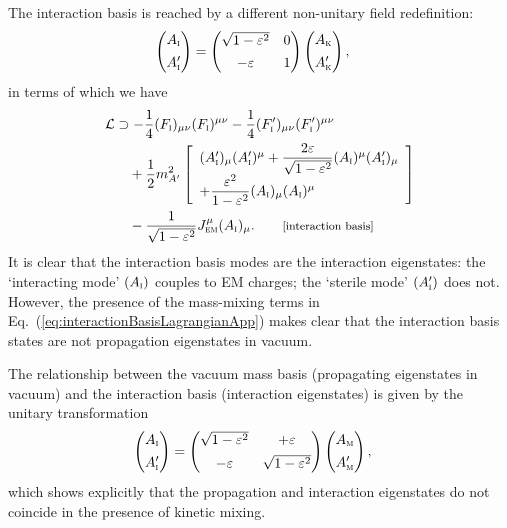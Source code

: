\documentclass[amsmath,amssymb,aps,10pt,prd,letterpaper,nofootinbib,balancelastpage,notitlepage,superscriptaddress,twocolumn,floatfix]{revtex4-2}
\renewcommand{\eqref}[2][]{Eq{#1}.~(\ref{eq:#2})}	%
\newcommand{\lb}{\ensuremath{\left}}					%
\newcommand{\rb}{\ensuremath{\right}}					%
\newcommand{\nl}{\nonumber \\ & \quad }					%
\newcommand{\LL}{\mathcal{L}}
\newcommand{\inter}[1]{({#1}_{\textsc{i}})}
\newcommand{\primeinter}[1]{({#1}_{\textsc{i}}^\prime)}
\begin{document}
The interaction basis is reached by a different non-unitary field redefinition:
\begin{align}
    \begin{pmatrix}
    A_{\textsc{i}} \\[1ex]
    A_{\textsc{i}}'  
    \end{pmatrix}
    &= \begin{pmatrix}
        \sqrt{1-\varepsilon^2} & 0 \\[1ex]
    -\varepsilon & 1 
    \end{pmatrix}
    \begin{pmatrix}
   A_{\textsc{k}} \\[1ex]
   A_{\textsc{k}}'
    \end{pmatrix},
    \label{eq:kineticTOinteraction}
\end{align}
in terms of which we have
\begin{align}
    \LL &\supset - \frac{1}{4} \inter{F}_{\mu\nu}\inter{F}^{\mu\nu} - \frac{1}{4} \primeinter{F}_{\mu\nu} \primeinter{F}^{\mu\nu} \nl
    + \frac{1}{2} m_{A'}^2 \lb[\begin{array}{l}
            \primeinter{A}_\mu \primeinter{A}^{\mu} + \dfrac{2\varepsilon}{\sqrt{1-\varepsilon^2}} \inter{A}^\mu \primeinter{A}_\mu \\[1ex]
            + \dfrac{\varepsilon^2}{1-\varepsilon^2} \inter{A}_\mu \inter{A}^\mu
            \end{array} \rb] \nl
    - \dfrac{1}{\sqrt{1-\varepsilon^2}} J_{\textsc{em}}^\mu \inter{A}_\mu.  \qquad \text{\footnotesize[interaction basis]}
    \label{eq:interactionBasisLagrangianApp}
\end{align}
It is clear that the interaction basis modes are the interaction eigenstates: the `interacting mode' $\inter{A}$ couples to EM charges; the `sterile mode' $\primeinter{A}$ does not.
However, the presence of the mass-mixing terms in \eqref{interactionBasisLagrangianApp} makes clear that the interaction basis states are not propagation eigenstates in vacuum.

The relationship between the vacuum mass basis (propagating eigenstates in vacuum) and the interaction basis (interaction eigenstates) is given by the unitary transformation
\begin{align}
    \begin{pmatrix}
    A_{\textsc{i}} \\[1ex]
    A_{\textsc{i}}'  
    \end{pmatrix}
    &= \begin{pmatrix}
        \sqrt{1-\varepsilon^2} & +\varepsilon \\[1ex]
    -\varepsilon & \sqrt{1-\varepsilon^2}
    \end{pmatrix}
    \begin{pmatrix}
   A_{\textsc{m}} \\[1ex]
   A_{\textsc{m}}'
    \end{pmatrix},
    \label{eq:massTOinteraction}
\end{align}
which shows explicitly that the propagation and interaction eigenstates do not coincide in the presence of kinetic mixing.
\end{document}
